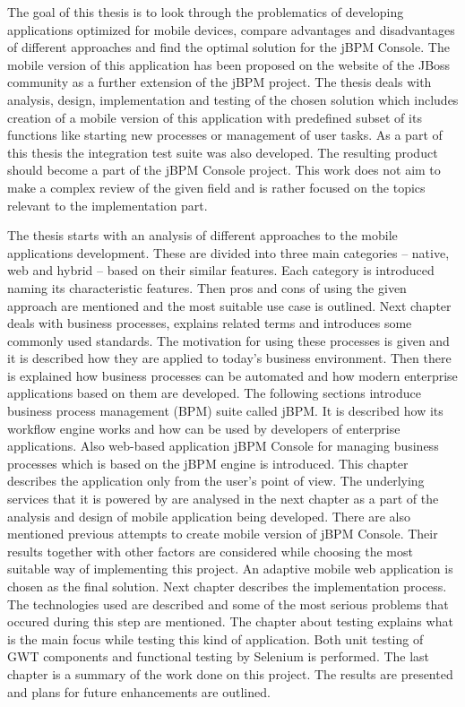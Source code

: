 \documentclass[12pt,oneside,final]{fithesis2}
\begin{document}
The goal of this thesis is to look through the problematics of developing applications optimized for mobile devices, compare advantages and disadvantages of different approaches and find the optimal solution for the jBPM Console\footnotemark{}.
The mobile version of this application has been proposed on the website of the JBoss community\footnotemark{} as a further extension of the jBPM project\footnotemark{}.
The thesis deals with analysis, design, implementation and testing of the chosen solution which includes creation of a mobile version of this application with predefined subset of its functions like starting new processes or management of user tasks.
As a part of this thesis the integration test suite was also developed.
The resulting product should become a part of the jBPM Console project.
This work does not aim to make a complex review of the given field and is rather focused on the topics relevant to the implementation part.

The thesis starts with an analysis of different approaches to the mobile applications development.
These are divided into three main categories -- native, web and hybrid -- based on their similar features.
Each category is introduced naming its characteristic features.
Then pros and cons of using the given approach are mentioned and the most suitable use case is outlined.
Next chapter deals with business processes, explains related terms and introduces some commonly used standards.
The motivation for using these processes is given and it is described how they are applied to today's business environment.
Then there is explained how business processes can be automated and how modern enterprise applications based on them are developed.
The following sections introduce business process management (BPM) suite called jBPM.
It is described how its workflow engine works and how can be used by developers of enterprise applications.
Also web-based application jBPM Console for managing business processes which is based on the jBPM engine is introduced.
This chapter describes the application only from the user's point of view.
The underlying services that it is powered by are analysed in the next chapter as a part of the analysis and design of mobile application being developed.
There are also mentioned previous attempts to create mobile version of jBPM Console.
Their results together with other factors are considered while choosing the most suitable way of implementing this project.
An adaptive mobile web application is chosen as the final solution.
Next chapter describes the implementation process.
The technologies used are described and some of the most serious problems that occured during this step are mentioned.
The chapter about testing explains what is the main focus while testing this kind of application.
Both unit testing of GWT components and functional testing by Selenium is performed.
The last chapter is a summary of the work done on this project.
The results are presented and plans for future enhancements are outlined.
\end{document}
